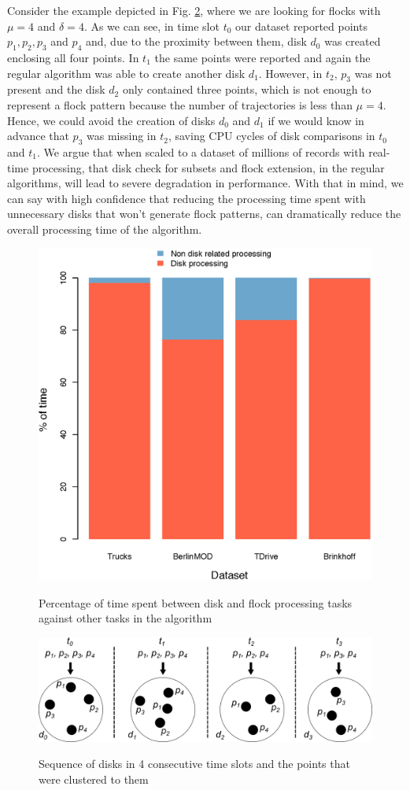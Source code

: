 Consider the example depicted in Fig. \ref{fig:disks}, where we are looking for flocks with $\mu=4$ and $\delta=4$. As
we can see, in time slot $t_0$ our dataset reported points $p_1,p_2,p_3$ and $p_4$ and, due to the proximity between
them, disk $d_0$ was created enclosing all four points. In $t_1$ the same points were reported and again the regular
algorithm was able to create another disk $d_1$. However, in $t_2$, $p_3$ was not present and the disk $d_2$ only
contained three points, which is not enough to represent a flock pattern because the number of trajectories is less than
$\mu = 4$. Hence, we could avoid the creation of disks $d_0$ and $d_1$ if we would know in advance that $p_3$ was
missing in $t_2$, saving CPU cycles of disk comparisons in $t_0$ and $t_1$. We argue that when scaled to a dataset of
millions of records with real-time processing, that disk check for subsets and flock extension, in the regular
algorithms, will lead to severe degradation in performance. With that in mind, we can say with high confidence that
reducing the processing time spent with unnecessary disks that won't generate flock patterns, can dramatically reduce
the overall processing time of the algorithm.

\begin{figure}[h!]
    \centering
    \caption{Percentage of time spent between disk and flock processing tasks against other tasks in the algorithm}
    \includegraphics[width=0.7\linewidth]{images/timeConsumption.eps}
    \label{fig:time_consumption}
\end{figure}

\begin{figure}[h!]
    \centering
    \caption{Sequence of disks in 4 consecutive time slots and the points that were clustered to them}
    \includegraphics[width=\linewidth]{images/disks_2.png}
    \label{fig:disks}
\end{figure}

